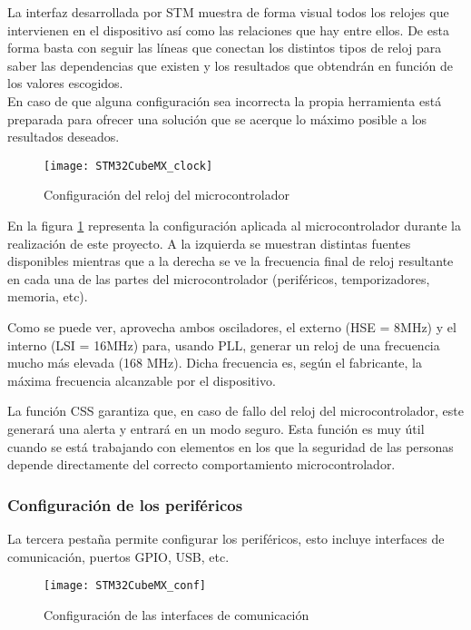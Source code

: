 La interfaz desarrollada por STM muestra de forma visual todos los relojes que intervienen en el dispositivo así como las relaciones que hay entre ellos. De esta forma basta con seguir las líneas que conectan los distintos tipos de reloj para saber las dependencias que existen y los resultados que obtendrán en función de los valores escogidos.
\\En caso de que alguna configuración sea incorrecta la propia herramienta está preparada para ofrecer una solución que se acerque lo máximo posible a los resultados deseados.

\begin{figure} [h]
    \centering
    \texttt{[image: STM32CubeMX\_clock]}
    \caption{Configuración del reloj del microcontrolador}
    \label{fig:STM32CubeMX_clock}
\end{figure}

En la figura \ref{fig:STM32CubeMX_clock} representa la configuración aplicada al microcontrolador durante la realización de este proyecto. A la izquierda se muestran distintas fuentes disponibles mientras que a la derecha se ve la frecuencia final de reloj resultante en cada una de las partes del microcontrolador (periféricos, temporizadores, memoria, etc).

Como se puede ver, aprovecha ambos osciladores, el externo (\acrshort{HSE} = 8MHz) y el interno (\acrshort{LSI} = 16MHz) para, usando \acrshort{PLL}, generar un reloj de una frecuencia mucho más elevada (168 MHz). Dicha frecuencia es, según el fabricante, la máxima frecuencia alcanzable por el dispositivo.

La función \acrshort{CSS} garantiza que, en caso de fallo del reloj del microcontrolador, este generará una alerta y entrará en un modo seguro. Esta función es muy útil cuando se está trabajando con elementos en los que la seguridad de las personas depende directamente del correcto comportamiento microcontrolador.

\clearpage

\subsubsection{Configuración de los periféricos\label{sec:Configuracion_micro_com}}

La tercera pestaña permite configurar los periféricos, esto incluye interfaces de comunicación, puertos GPIO, USB, etc.

\begin{figure} [h]
    \centering
    \texttt{[image: STM32CubeMX\_conf]}
    \caption{Configuración de las interfaces de comunicación}
    \label{fig:STM32CubeMX_conf}
\end{figure}

